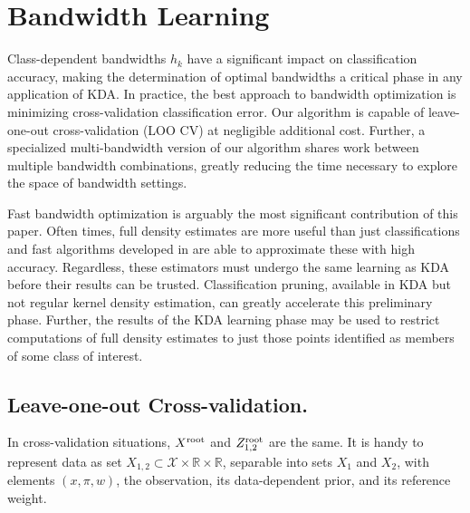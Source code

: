 \documentclass[twoside,leqno,twocolumn]{article}
\newcommand{\kdroot}[1]{#1^{\rm root}}
\begin{document}
\section{Bandwidth Learning}\label{sec:bw}
Class-dependent bandwidths $h_k$ have a significant impact on
classification accuracy, making the determination of optimal
bandwidths a critical phase in any application of KDA.  In practice,
the best approach to bandwidth optimization is minimizing
cross-validation classification error.  Our algorithm is capable of
leave-one-out cross-validation (LOO CV) at negligible additional cost.
Further, a specialized multi-bandwidth version of our algorithm shares
work between multiple bandwidth combinations, greatly reducing the
time necessary to explore the space of bandwidth settings.

Fast bandwidth optimization is arguably the most significant
contribution of this paper.  Often times, full density estimates are
more useful than just classifications and fast algorithms developed in
\cite{nips2000paper, kde-siamdm, kde-nips-dong, kde-uai-dong} are able
to approximate these with high accuracy.  Regardless, these estimators
must undergo the same learning as KDA before their results can be
trusted.  Classification pruning, available in KDA but not regular
kernel density estimation, can greatly accelerate this preliminary
phase.  Further, the results of the KDA learning phase may be used to
restrict computations of full density estimates to just those points
identified as members of some class of interest.

\subsection{Leave-one-out Cross-validation.}
In cross-validation situations, $\kdroot{X}$ and $\kdroot{Z}_{1,2}$
are the same.  It is handy to represent data as set $X_{1,2} \subset
\mathcal{X} \times \mathbb{R} \times \mathbb{R}$, separable into sets
$X_1$ and $X_2$, with elements $(x,\pi,w)$, the observation, its
data-dependent prior, and its reference weight.
\end{document}
